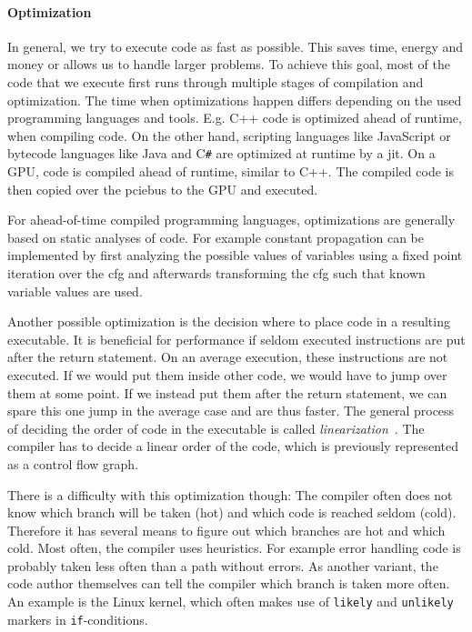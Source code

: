 \paragraph{Optimization} In general, we try to execute code as fast as possible. This saves time, energy and money or allows us to handle larger problems. To achieve this goal, most of the code that we execute first runs through multiple stages of compilation and optimization. The time when optimizations happen differs depending on the used programming languages and tools.
E.g. C++ code is optimized ahead of runtime, when compiling code. On the other hand, scripting languages like JavaScript or bytecode languages like Java and C\texttt{\#} are optimized at runtime by a \gls{jit}.
On a GPU, code is compiled ahead of runtime, similar to C++. The compiled code is then copied over the \gls{pciebus} to the GPU and executed.

For ahead-of-time compiled programming languages, optimizations are generally based on static analyses of code. For example constant propagation can be implemented by first analyzing the possible values of variables using a fixed point iteration over the \gls{cfg} and afterwards transforming the \gls{cfg} such that known variable values are used.~\cite{Seidl2010}

Another possible optimization is the decision where to place code in a resulting executable. It is beneficial for performance if seldom executed instructions are put after the return statement. On an average execution, these instructions are not executed. If we would put them inside other code, we would have to jump over them at some point. If we instead put them after the return statement, we can spare this one jump in the average case and are thus faster. The general process of deciding the order of code in the executable is called \emph{linearization}~\cite{Seidl2010}. The compiler has to decide a linear order of the code, which is previously represented as a control flow graph.

There is a difficulty with this optimization though: The compiler often does not know which branch will be taken (hot) and which code is reached seldom (cold). Therefore it has several means to figure out which branches are hot and which cold. Most often, the compiler uses heuristics. For example error handling code is probably taken less often than a path without errors. As another variant, the code author themselves can tell the compiler which branch is taken more often. An example is the Linux kernel, which often makes use of \texttt{likely} and \texttt{unlikely} markers in \texttt{if}-conditions.

